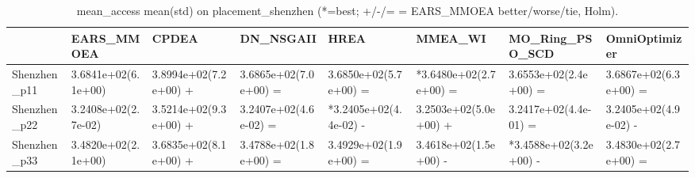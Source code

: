 \begin{table}[t]
\centering
\caption{mean_access mean(std) on placement_shenzhen (*=best; +/-/= = EARS_MMOEA better/worse/tie, Holm).}
\label{tab:placement_shenzhen_mean_access}
\begin{tabular}{llllllll}
\toprule
 & EARS\_MMOEA & CPDEA & DN\_NSGAII & HREA & MMEA\_WI & MO\_Ring\_PSO\_SCD & OmniOptimizer \\
\midrule
Shenzhen\_p11 & 3.6841e+02(6.1e+00) & 3.8994e+02(7.2e+00) + & 3.6865e+02(7.0e+00) = & 3.6850e+02(5.7e+00) = & *3.6480e+02(2.7e+00) = & 3.6553e+02(2.4e+00) = & 3.6867e+02(6.3e+00) = \\
Shenzhen\_p22 & 3.2408e+02(2.7e-02) & 3.5214e+02(9.3e+00) + & 3.2407e+02(4.6e-02) = & *3.2405e+02(4.4e-02) - & 3.2503e+02(5.0e+00) + & 3.2417e+02(4.4e-01) = & 3.2405e+02(4.9e-02) - \\
Shenzhen\_p33 & 3.4820e+02(2.1e+00) & 3.6835e+02(8.1e+00) + & 3.4788e+02(1.8e+00) = & 3.4929e+02(1.9e+00) = & 3.4618e+02(1.5e+00) - & *3.4588e+02(3.2e+00) - & 3.4830e+02(2.7e+00) = \\
\bottomrule
\end{tabular}
\end{table}
